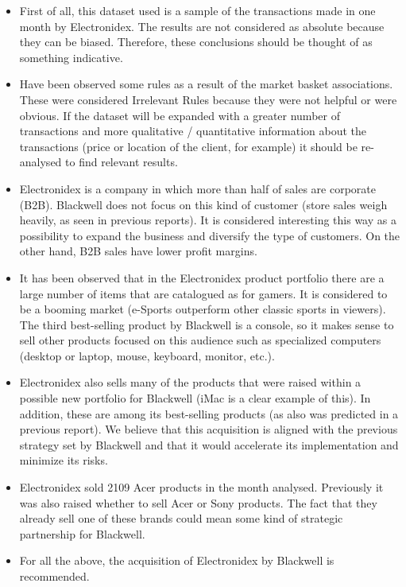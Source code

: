 \documentclass[]{article}
\providecommand{\tightlist}{%
  \setlength{\itemsep}{0pt}\setlength{\parskip}{0pt}}
\begin{document}
\begin{itemize}
\tightlist
\item
  First of all, this dataset used is a sample of the transactions made
  in one month by Electronidex. The results are not considered as
  absolute because they can be biased. Therefore, these conclusions
  should be thought of as something indicative.
\item
  Have been observed some rules as a result of the market basket
  associations. These were considered Irrelevant Rules because they were
  not helpful or were obvious. If the dataset will be expanded with a
  greater number of transactions and more qualitative / quantitative
  information about the transactions (price or location of the client,
  for example) it should be re-analysed to find relevant results.
\item
  Electronidex is a company in which more than half of sales are
  corporate (B2B). Blackwell does not focus on this kind of customer
  (store sales weigh heavily, as seen in previous reports). It is
  considered interesting this way as a possibility to expand the
  business and diversify the type of customers. On the other hand, B2B
  sales have lower profit margins.
\item
  It has been observed that in the Electronidex product portfolio there
  are a large number of items that are catalogued as for gamers. It is
  considered to be a booming market (e-Sports outperform other classic
  sports in viewers). The third best-selling product by Blackwell is a
  console, so it makes sense to sell other products focused on this
  audience such as specialized computers (desktop or laptop, mouse,
  keyboard, monitor, etc.).
\item
  Electronidex also sells many of the products that were raised within a
  possible new portfolio for Blackwell (iMac is a clear example of
  this). In addition, these are among its best-selling products (as also
  was predicted in a previous report). We believe that this acquisition
  is aligned with the previous strategy set by Blackwell and that it
  would accelerate its implementation and minimize its risks.
\item
  Electronidex sold 2109 Acer products in the month analysed. Previously
  it was also raised whether to sell Acer or Sony products. The fact
  that they already sell one of these brands could mean some kind of
  strategic partnership for Blackwell.
\item
  For all the above, the acquisition of Electronidex by Blackwell is
  recommended.
\end{itemize}
\end{document}
